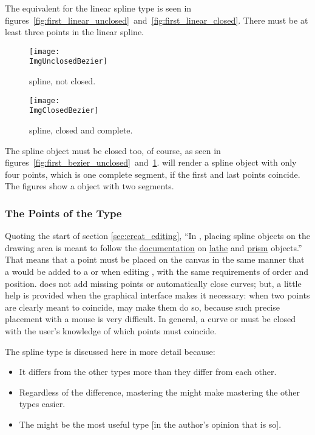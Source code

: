 		The equivalent for the linear spline type is seen in
		figures~\ref{fig:first_linear_unclosed}~and~\ref{fig:first_linear_closed}.
		There must be at least three points in the linear spline.		

		\begin{figure}[htbp]
		\centering
		\texttt{[image: \\ImgUnclosedBezier]}
		\caption{\dtybezieru{} spline, not closed.}
		\label{fig:first_bezier_unclosed}
		\vspace{16pt}
		\texttt{[image: \\ImgClosedBezier]}
		\caption{\dtybezieru{} spline, closed and complete.}
		\label{fig:first_bezier_closed}
		\end{figure}

		The \dtybezierl{} spline object must be closed too, of course,
		as seen in
		figures~\ref{fig:first_bezier_unclosed}~and~\ref{fig:first_bezier_closed}.
		\IXpov{} will render a \dtybezierl{} spline object with only
		four points, which is one complete segment, if the first
		and last points coincide.
		The figures show a \dtybezierl{} object
		with two segments.

			\subsubsection{The Points of the \dtybezieru{} Type}%
			\label{sssec:editing_points_bezier}
			Quoting the start of section
			\ref{sec:creat_editing},
			``In \IXpkg{}, placing spline
			objects on the drawing area is meant to follow the
			\IXpov{} \href{\URLPOVdocs}{documentation}
			on
			\href{\URLPOVdocsLathe}{lathe}
			and
			\href{\URLPOVdocsPrism}{prism}
			objects.''
			That means that a point must be placed on the canvas
			in the same manner that a  would
			be added to a  or  when
			editing ,
			with the same requirements of order and position.
			\IXpkgu{} does not add missing points or
			automatically close curves; but, a little help
			is provided when the graphical interface makes
			it necessary: when two points are clearly meant
			to coincide, \IXpkg{} may make them do so, because
			such precise placement with a mouse is very
			difficult. In general, a curve or 
			must be closed with the user's knowledge of
			which points must coincide.
			
			The \IXbezn{} spline type is discussed here in more detail
			because:
			
			\begin{itemize}
				\item It differs from the other types more
						than they differ from each other.
				\item Regardless of the difference, mastering
						the \IXbezn{} might make mastering the
						other types easier.
				\item The \IXbezn{} might be the most
						useful type [in the author's opinion
						that is so].
			\end{itemize}
			
